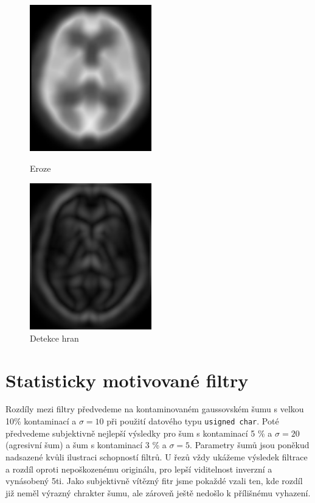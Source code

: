      \begin{figure}[h]
        \begin{minipage}[l]{0.5\textwidth}
            \center
            \includegraphics[width = 150pt]{src/8Appendix/final/eroze.png}
            \caption{Eroze}
        \end{minipage}
        \begin{minipage}[r]{0.5\textwidth}
            \center
            \includegraphics[width = 150pt]{src/8Appendix/final/hrany.png}
            \caption{Detekce hran}
        \end{minipage}
    \end{figure}


    \section{Statisticky motivované filtry}

    Rozdíly mezi filtry předvedeme na kontaminovaném gaussovském šumu s velkou 10\% kontaminací a $\sigma = 10$ při použití datového typu {\tt usigned char}. Poté předvedeme subjektivně nejlepší výsledky pro šum s kontaminací 5 \% a $\sigma = 20$ (agresivní šum) a šum s kontaminací 3 \% a $\sigma = 5$. Parametry šumů jsou poněkud nadsazené kvůli ilustraci schopností filtrů. U řezů vždy ukážeme výsledek filtrace a rozdíl oproti nepoškozenému originálu, pro lepší viditelnost inverzní a vynásobený 5ti. Jako subjektivně vítězný fitr jsme pokaždé vzali ten, kde rozdíl již neměl výrazný chrakter šumu, ale zároveň ještě nedošlo k přílišnému vyhazení.
    
